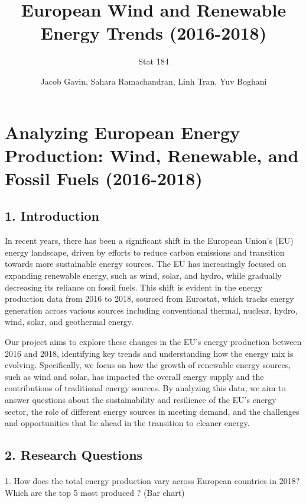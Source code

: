 \documentclass[
  letterpaper,
  DIV=11,
  numbers=noendperiod]{scrartcl}
\title{European Wind and Renewable Energy Trends (2016-2018)}
\subtitle{Stat 184}
\author{Jacob Gavin, Sahara Ramachandran, Linh Tran, Yuv Boghani}
\date{}
\makeatletter
\let\oldparagraph\paragraph
\renewcommand{\paragraph}{
    \@ifstar
      \xxxParagraphStar
      \xxxParagraphNoStar
  }
\newcommand{\xxxParagraphStar}[1]{\oldparagraph*{#1}\mbox{}}
\newcommand{\xxxParagraphNoStar}[1]{\oldparagraph{#1}\mbox{}}
\makeatother
\begin{document}
\maketitle


\section{Analyzing European Energy Production: Wind, Renewable, and
Fossil Fuels
(2016-2018)}\label{analyzing-european-energy-production-wind-renewable-and-fossil-fuels-2016-2018}

\subsection{1. Introduction}\label{introduction}

In recent years, there has been a significant shift in the European
Union's (EU) energy landscape, driven by efforts to reduce carbon
emissions and transition towards more sustainable energy sources. The EU
has increasingly focused on expanding renewable energy, such as wind,
solar, and hydro, while gradually decreasing its reliance on fossil
fuels. This shift is evident in the energy production data from 2016 to
2018, sourced from Eurostat, which tracks energy generation across
various sources including conventional thermal, nuclear, hydro, wind,
solar, and geothermal energy.

Our project aims to explore these changes in the EU's energy production
between 2016 and 2018, identifying key trends and understanding how the
energy mix is evolving. Specifically, we focus on how the growth of
renewable energy sources, such as wind and solar, has impacted the
overall energy supply and the contributions of traditional energy
sources. By analyzing this data, we aim to answer questions about the
sustainability and resilience of the EU's energy sector, the role of
different energy sources in meeting demand, and the challenges and
opportunities that lie ahead in the transition to cleaner energy.

\subsection{2. Research Questions}\label{research-questions}

\paragraph{1. How does the total energy production vary across European
countries in 2018? Which are the top 5 most produced ? (Bar
chart)}\label{how-does-the-total-energy-production-vary-across-european-countries-in-2018-which-are-the-top-5-most-produced-bar-chart}
\end{document}
